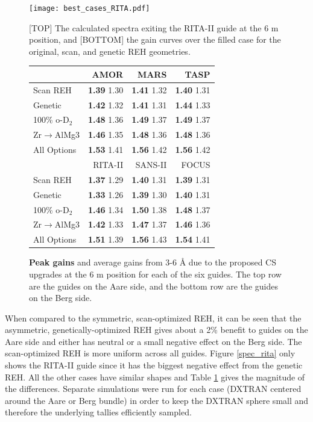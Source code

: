\documentclass[a4paper]{jpconf}
\begin{document}
\begin{figure}[h!]
\CenterFloatBoxes
\begin{floatrow}
\ffigbox
  {\texttt{[image: best\_cases\_RITA.pdf]}}
  {\caption{ [TOP] The calculated spectra exiting the RITA-II guide at the 6 m position, and [BOTTOM] the gain curves over the filled case for the original, scan, and genetic REH geometries.}\label{spec_rita}}
\killfloatstyle
\ttabbox
  {\begin{tabular}{| l | r | r | r |}
\hline
                      & AMOR              & MARS              & TASP        \\ 
 \hline
 Scan REH             & {\bf 1.39} 1.30   & {\bf 1.41} 1.32   & {\bf 1.40} 1.31   \\  
 \hline
 Genetic              & {\bf 1.42} 1.32   & {\bf 1.41} 1.31   & {\bf 1.44} 1.33   \\  
 \hline
 100\% o-D$_2$        & {\bf 1.48} 1.36   & {\bf 1.49} 1.37   & {\bf 1.49} 1.37   \\  
 \hline
 Zr$\rightarrow$AlMg3 & {\bf 1.46} 1.35   & {\bf 1.48} 1.36   & {\bf 1.48} 1.36   \\  
 \hline
 All Options          & {\bf 1.53} 1.41   & {\bf 1.56} 1.42   & {\bf 1.56} 1.42   \\    
 \hline
 \hline
                      & RITA-II           & SANS-II           & FOCUS       \\ 
 \hline
 Scan REH             & {\bf 1.37} 1.29   & {\bf 1.40} 1.31   & {\bf 1.39} 1.31   \\  
 \hline
 Genetic              & {\bf 1.33} 1.26   & {\bf 1.39} 1.30   & {\bf 1.40} 1.31   \\  
 \hline
 100\% o-D$_2$        & {\bf 1.46} 1.34   & {\bf 1.50} 1.38   & {\bf 1.48} 1.37   \\  
 \hline
 Zr$\rightarrow$AlMg3 & {\bf 1.42} 1.33   & {\bf 1.47} 1.37   & {\bf 1.46} 1.36   \\  
 \hline
 All Options          & {\bf 1.51} 1.39   & {\bf 1.56} 1.43   & {\bf 1.54} 1.41   \\  
 \hline
\end{tabular}
  }
  {\caption{{\bf Peak gains} and average gains from 3-6 {\AA} due to the proposed CS upgrades at the 6 m position for each of the six guides.  The top row are the guides on the Aare side, and the bottom row are the guides on the Berg side.}\label{tab:allguides}}
\end{floatrow}
\end{figure}

When compared to the symmetric, scan-optimized REH, it can be seen that the asymmetric, genetically-optimized REH gives about a 2\% benefit to guides on the Aare side and either has neutral or a small negative effect on the Berg side.  The scan-optimized REH is more uniform across all guides.  Figure \ref{spec_rita} only shows the RITA-II guide since it has the biggest negative effect from the genetic REH.  All the other cases have similar shapes and Table \ref{tab:allguides} gives the magnitude of the differences.  Separate simulations were run for each case (DXTRAN centered around the Aare or Berg bundle) in order to keep the DXTRAN sphere small and therefore the underlying tallies efficiently sampled.  
\end{document}
